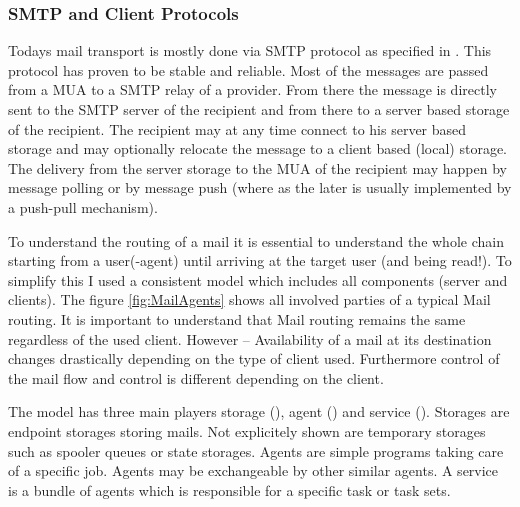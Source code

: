 \subsubsection{SMTP and Client Protocols}
Todays mail transport is mostly done via SMTP protocol as specified in \cite{RFC5321}. This protocol has proven to be stable and reliable. Most of the messages are passed from a MUA to a SMTP relay of a provider. From there the message is directly sent to the SMTP server of the recipient and from there to a server based storage of the recipient. The recipient may at any time connect to his server based storage and may optionally relocate the message to a client based (local) storage. The delivery from the server storage to the MUA of the recipient may happen by message polling or by message push (where as the later is usually implemented by a push-pull mechanism).

To understand the routing of a mail it is essential to understand the whole chain starting from a user(-agent) until arriving at the target user (and being read!). To simplify this I used a consistent model which includes all components (server and clients). The figure \ref{fig:MailAgents} shows all involved parties of a typical Mail routing. It is important to understand that Mail routing remains the same regardless of the used client. However -- Availability of a mail at its destination changes drastically depending on the type of client used. Furthermore control of the mail flow and control is different depending on the client.

The model has three main players storage (), agent () and service (). Storages are endpoint storages storing mails. Not explicitely shown are temporary storages such as spooler queues or state storages. Agents are simple programs taking care of a specific job. Agents may be exchangeable by other similar agents. A service is a bundle of agents which is responsible for a specific task or task sets.


